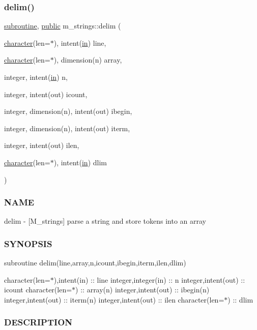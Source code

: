 \subsubsection{\texorpdfstring{delim()}{delim()}}
{\footnotesize\ttfamily \hyperlink{M__stopwatch_83_8txt_acfbcff50169d691ff02d4a123ed70482}{subroutine}, \hyperlink{M__stopwatch_83_8txt_a2f74811300c361e53b430611a7d1769f}{public} m\+\_\+strings\+::delim (\begin{DoxyParamCaption}\item[{\hyperlink{option__stopwatch_83_8txt_abd4b21fbbd175834027b5224bfe97e66}{character}(len=$\ast$), intent(\hyperlink{M__journal_83_8txt_afce72651d1eed785a2132bee863b2f38}{in})}]{line,  }\item[{\hyperlink{option__stopwatch_83_8txt_abd4b21fbbd175834027b5224bfe97e66}{character}(len=$\ast$), dimension(n)}]{array,  }\item[{integer, intent(\hyperlink{M__journal_83_8txt_afce72651d1eed785a2132bee863b2f38}{in})}]{n,  }\item[{integer, intent(out)}]{icount,  }\item[{integer, dimension(n), intent(out)}]{ibegin,  }\item[{integer, dimension(n), intent(out)}]{iterm,  }\item[{integer, intent(out)}]{ilen,  }\item[{\hyperlink{option__stopwatch_83_8txt_abd4b21fbbd175834027b5224bfe97e66}{character}(len=$\ast$), intent(\hyperlink{M__journal_83_8txt_afce72651d1eed785a2132bee863b2f38}{in})}]{dlim }\end{DoxyParamCaption})}



\subsubsection*{N\+A\+ME}

delim -\/ \mbox{[}M\+\_\+strings\mbox{]} parse a string and store tokens into an array \subsubsection*{S\+Y\+N\+O\+P\+S\+IS}

subroutine delim(line,array,n,icount,ibegin,iterm,ilen,dlim)

character(len=$\ast$),intent(in) \+:\+: line integer,integer(in) \+:\+: n integer,intent(out) \+:\+: icount character(len=$\ast$) \+:\+: array(n) integer,intent(out) \+:\+: ibegin(n) integer,intent(out) \+:\+: iterm(n) integer,intent(out) \+:\+: ilen character(len=$\ast$) \+:\+: dlim \subsubsection*{D\+E\+S\+C\+R\+I\+P\+T\+I\+ON}

